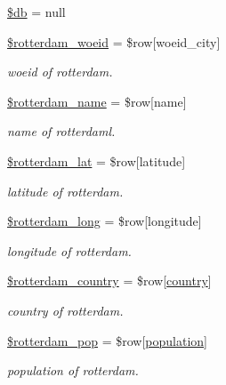 \begin{DoxyCompactItemize}
\mbox{\hyperlink{index_8php_a1fa3127fc82f96b1436d871ef02be319}{\$db}} = null
\item 
\mbox{\hyperlink{index_8php_a7ff0c47a623b98fd9f9e0dee5abbefcd}{\$rotterdam\+\_\+woeid}} = \$row\mbox{[}\textquotesingle{}woeid\+\_\+city\textquotesingle{}\mbox{]}
\begin{DoxyCompactList}\small\item\em woeid of rotterdam. \end{DoxyCompactList}\item 
\mbox{\hyperlink{index_8php_a0780d98281b29a8000a31c4df7de97a5}{\$rotterdam\+\_\+name}} = \$row\mbox{[}\textquotesingle{}name\textquotesingle{}\mbox{]}
\begin{DoxyCompactList}\small\item\em name of rotterdaml. \end{DoxyCompactList}\item 
\mbox{\hyperlink{index_8php_a8b6b05e0c62675c3c8477cb3128d546c}{\$rotterdam\+\_\+lat}} = \$row\mbox{[}\textquotesingle{}latitude\textquotesingle{}\mbox{]}
\begin{DoxyCompactList}\small\item\em latitude of rotterdam. \end{DoxyCompactList}\item 
\mbox{\hyperlink{index_8php_a5a22865a4d2173cb8eb524d226a98331}{\$rotterdam\+\_\+long}} = \$row\mbox{[}\textquotesingle{}longitude\textquotesingle{}\mbox{]}
\begin{DoxyCompactList}\small\item\em longitude of rotterdam. \end{DoxyCompactList}\item 
\mbox{\hyperlink{index_8php_a14facdd37996bc41b1e5db7e1dc56f94}{\$rotterdam\+\_\+country}} = \$row\mbox{[}\textquotesingle{}\mbox{\hyperlink{index_8php_a0f0752705301c982dc8994ebc993e6e9}{country}}\textquotesingle{}\mbox{]}
\begin{DoxyCompactList}\small\item\em country of rotterdam. \end{DoxyCompactList}\item 
\mbox{\hyperlink{index_8php_a2a52e2eb9ee3b164cd210abb0cce25a7}{\$rotterdam\+\_\+pop}} = \$row\mbox{[}\textquotesingle{}\mbox{\hyperlink{index_8php_aa78fa356925cd3f67d485c4d6846202b}{population}}\textquotesingle{}\mbox{]}
\begin{DoxyCompactList}\small\item\em population of rotterdam. \end{DoxyCompactList}\item 

\end{DoxyCompactItemize}
